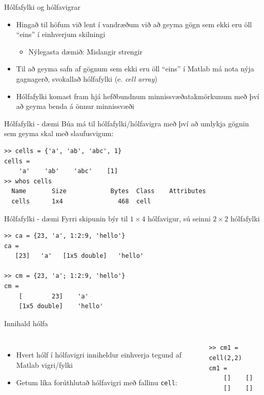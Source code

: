 \documentclass{beamer}
\begin{document}
\begin{frame}{Hólfafylki og hólfavigrar}
\begin{itemize}
 \item Hingað til höfum við lent í vandræðum við að geyma gögn sem ekki eru öll ``eins'' í einhverjum skilningi
 \begin{itemize}
  \item Nýlegasta dæmið: Mislangir strengir
 \end{itemize}
 \item Til að geyma safn af gögnum sem ekki eru öll ``eins'' í Matlab má nota nýja gagnagerð, svokallað hólfafylki (e. \emph{cell array})
 \item Hólfafylki komast fram hjá hefðbundnum minnissvæðatakmörkunum með því að geyma benda á önnur minnissvæði
\end{itemize}
\end{frame}

\begin{frame}[fragile]{Hólfafylki - dæmi}
Búa má til hólfafylki/hólfavigra með því að umlykja gögnin sem geyma skal með slaufusvigum:

\begin{verbatim}
>> cells = {'a', 'ab', 'abc', 1}
cells = 
    'a'    'ab'    'abc'    [1]
>> whos cells
  Name       Size            Bytes  Class    Attributes
  cells      1x4               468  cell
\end{verbatim}
\end{frame}

\begin{frame}[fragile]{Hólfafylki - dæmi}
Fyrri skipunin býr til $1\times 4$ hólfavigur, sú seinni $2 \times 2$ hólfafylki
\begin{verbatim}
>> ca = {23, 'a', 1:2:9, 'hello'} 
ca = 
   [23]   'a'   [1x5 double]   'hello'

>> cm = {23, 'a'; 1:2:9, 'hello'}
cm = 
    [        23]    'a'    
    [1x5 double]    'hello'
\end{verbatim}
\end{frame}

\begin{frame}[fragile]{Innihald hólfa}
\begin{columns}
\begin{itemize}
 \item Hvert hólf í hólfavigri inniheldur einhverja tegund af Matlab vigri/fylki
 \item Getum líka forúthlutað hólfavigri með fallinu \texttt{cell}:
\end{itemize}
\begin{verbatim}
>> cm1 = cell(2,2)
cm1 = 
    []    []
    []    []
\end{verbatim}
\end{columns}
\end{frame}
\end{document}
